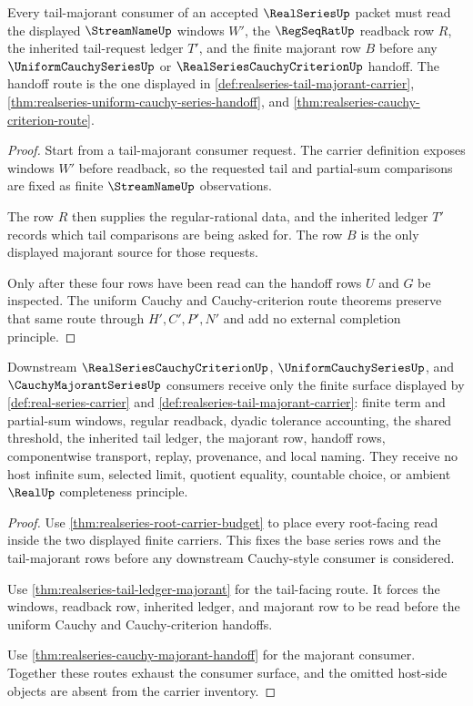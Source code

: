 \begin{theorem}
\label{thm:realseries-tail-ledger-majorant}
Every tail-majorant consumer of an accepted $\RealSeriesUp$ packet must read the displayed $\StreamNameUp$ windows $W'$, the $\RegSeqRatUp$ readback row $R$, the inherited tail-request ledger $T'$, and the finite majorant row $B$ before any $\UniformCauchySeriesUp$ or $\RealSeriesCauchyCriterionUp$ handoff. The handoff route is the one displayed in \autoref{def:realseries-tail-majorant-carrier}, \autoref{thm:realseries-uniform-cauchy-series-handoff}, and \autoref{thm:realseries-cauchy-criterion-route}.
\end{theorem}
\begin{proof}
Start from a tail-majorant consumer request. The carrier definition exposes windows $W'$ before readback, so the requested tail and partial-sum comparisons are fixed as finite $\StreamNameUp$ observations.

The row $R$ then supplies the regular-rational data, and the inherited ledger $T'$ records which tail comparisons are being asked for. The row $B$ is the only displayed majorant source for those requests.

Only after these four rows have been read can the handoff rows $U$ and $G$ be inspected. The uniform Cauchy and Cauchy-criterion route theorems preserve that same route through $H',C',P',N'$ and add no external completion principle.
\end{proof}

\begin{theorem}
\label{thm:realseries-cauchy-criterion-scope}
Downstream $\RealSeriesCauchyCriterionUp$, $\UniformCauchySeriesUp$, and $\CauchyMajorantSeriesUp$ consumers receive only the finite surface displayed by \autoref{def:real-series-carrier} and \autoref{def:realseries-tail-majorant-carrier}: finite term and partial-sum windows, regular readback, dyadic tolerance accounting, the shared threshold, the inherited tail ledger, the majorant row, handoff rows, componentwise transport, replay, provenance, and local naming. They receive no host infinite sum, selected limit, quotient equality, countable choice, or ambient $\RealUp$ completeness principle.
\end{theorem}
\begin{proof}
Use \autoref{thm:realseries-root-carrier-budget} to place every root-facing read inside the two displayed finite carriers. This fixes the base series rows and the tail-majorant rows before any downstream Cauchy-style consumer is considered.

Use \autoref{thm:realseries-tail-ledger-majorant} for the tail-facing route. It forces the windows, readback row, inherited ledger, and majorant row to be read before the uniform Cauchy and Cauchy-criterion handoffs.

Use \autoref{thm:realseries-cauchy-majorant-handoff} for the majorant consumer. Together these routes exhaust the consumer surface, and the omitted host-side objects are absent from the carrier inventory.
\end{proof}

